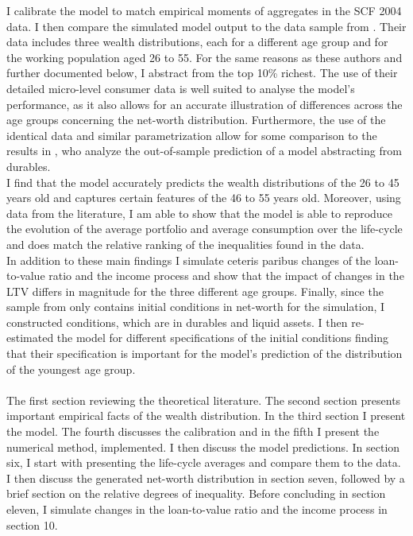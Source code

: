 \documentclass[12pt,a4paper,leqno]{article}
\theoremstyle{definition}
\begin{document}
I calibrate the model to match empirical moments of aggregates in the SCF 2004 data. I then compare the simulated model output to the data sample from \cite{hintermaier2011}. Their data includes three wealth distributions, each for a different age group and for the working population aged 26 to 55. For the same reasons as these authors and further documented below, I abstract from the top 10\% richest. The use of their detailed micro-level consumer data is well suited to analyse the model's performance, as it also allows for an accurate illustration of differences across the age groups concerning the net-worth distribution. Furthermore, the use of the identical data and similar parametrization allow for some comparison to the results in \cite{hintermaier2011}, who analyze the out-of-sample prediction of a model abstracting from durables.\\
I find that the model accurately predicts the wealth distributions of the 26 to 45 years old and captures certain features of the 46 to 55 years old. Moreover, using data from the literature, I am able to show that the model is able to reproduce the evolution of the average portfolio and average consumption over the life-cycle and does match the relative ranking of the inequalities found in the data. 
\\ 
In addition to these main findings I simulate ceteris paribus changes of the loan-to-value ratio and the income process and show that the impact of changes in the LTV differs in magnitude for the three different age groups. Finally, since the sample from \cite{hintermaier2011} only contains initial conditions in net-worth for the simulation, I constructed conditions, which are in durables and liquid assets. I then re-estimated the model for different specifications of the initial conditions finding that their specification is important for the model's prediction of the distribution of the youngest age group. 
\\ \\
The first section reviewing the theoretical literature. The second section presents important empirical facts of the wealth distribution. In the third section I present the model. The fourth discusses the calibration and in the fifth I present the numerical method, implemented. I then discuss the model predictions. In section six, I start with presenting the life-cycle averages and compare them to the data. I then discuss the generated net-worth distribution in section seven, followed by a brief section on the relative degrees of inequality. Before concluding in section eleven, I simulate changes in the loan-to-value ratio and the income process in section 10.
\end{document}
